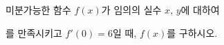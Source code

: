 미분가능한 함수 $f(x)$가 임의의 실수 $x$, $y$에 대하여 \par\smallskip{}\par\smallskip\noindent 를 만족시키고 $f'(0)=6$일 때, $f(x)$를 구하시오.
